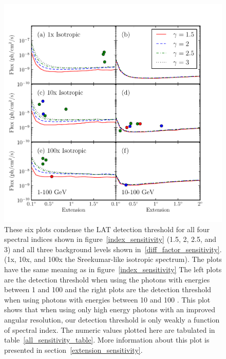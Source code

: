 \documentclass[12pt,preprint]{aastex}
\newcommand{\gev}{\text{GeV}\xspace}
\begin{document}
  \clearpage
\begin{appendices}

\begin{figure}
  \begin{center}
    \includegraphics{mc_plots/all_sensitivity.pdf}
    \end{center}
    \caption{These six plots condense the LAT detection threshold for
    all four spectral indices shown in figure~\ref{index_sensitivity}
    (1.5, 2, 2.5, and 3) and all three background levels shown
    in~\ref{diff_factor_sensitivity}.  (1x, 10x, and 100x the
    Sreekumar-like isotropic spectrum).  The plots have the same meaning
    as in figure~\ref{index_sensitivity} The left plots are the detection
    threshold when using the photons with energies between 1 \gev and
    100 \gev and the right plots are the detection threshold when using
    photons with energies between 10 \gev and 100 \gev.  This plot shows
    that when using only high energy photons with an improved angular
    resolution, our detection threshold is only weakly a function of
    spectral index. The numeric values plotted here are tabulated
    in table~\ref{all_sensitivity_table}. More information about this plot is presented
    in section~\ref{extension_sensitivity}.
    }\label{all_sensitivity} 
  \end{figure}


\end{appendices}
\end{document}
